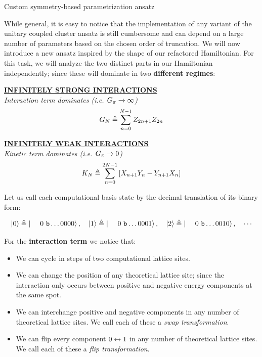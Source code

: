 \documentclass[9pt, handout, aspectratio=169]{beamer}	%
\begin{document}
\begin{frame}[allowframebreaks]{Custom symmetry-based parametrization ansatz}

	While general, it is easy to notice that the implementation of any variant of the unitary coupled cluster ansatz is still cumbersome and can depend on a large number of parameters based on the chosen order of truncation. We will now introduce a new ansatz inspired by the shape of our refactored Hamiltonian. For this task, we will analyze the two distinct parts in our Hamiltonian independently; since these will dominate in two \textbf{different regimes}:

	\begin{multicols}{2}

		\begin{center}
			\underline{\textbf{INFINITELY STRONG INTERACTIONS}}\\
			\small{\emph{Interaction term dominates (i.e. $G_{\pi} \rightarrow \infty$)}}
			\begin{gather*}
				G_{N} \triangleq \sum_{n=0}^{N-1} Z_{2n+1}Z_{2n}
			\end{gather*}
		\end{center}

		\columnbreak

		\begin{center}
			\underline{\textbf{INFINITELY WEAK INTERACTIONS}}\\
			\small{\emph{Kinetic term dominates (i.e. $G_{\pi} \rightarrow 0$)}}
			\begin{gather*}
			  K_{N} \triangleq \sum_{n=0}^{2N-1} \qty[ X_{n+1}Y_{n} - Y_{n+1}X_{n} ]
			\end{gather*}
		\end{center}

	\end{multicols}

	Let us call each computational basis state by the decimal translation of its binary form:

	\begin{gather*}
	  \ket{0} \defeq \ket{\bin\dots0000} \qc
	  \ket{1} \defeq \ket{\bin\dots0001} \qc
	  \ket{2} \defeq \ket{\bin\dots0010} \qc
	  \cdots
	\end{gather*}

\break

	For the \textbf{interaction term} we notice that:

	\medskip

	\begin{itemize}
	  \item We can cycle in steps of two computational lattice sites.
	  \item We can change the position of any theoretical lattice site; since the interaction only occurs between positive and negative energy components at the same spot.
	  \item We can interchange positive and negative components in any number of theoretical lattice sites. We call each of these a \emph{swap transformation}.
	  \item We can flip every component $0 \leftrightarrow 1$ in any number of theoretical lattice sites. We call each of these a \emph{flip transformation}.
	\end{itemize}


\end{frame}
\end{document}
